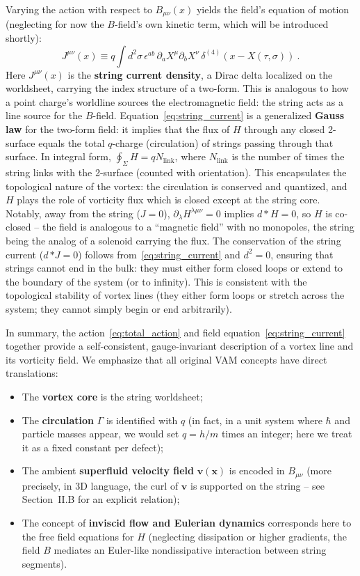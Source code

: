 \documentclass[12pt]{article}
\begin{document}
Varying the action with respect to $B_{\mu\nu}(x)$ yields the field's equation of motion (neglecting for now the $B$-field's own kinetic term, which will be introduced shortly):
\begin{equation}
J^{\mu\nu}(x) \equiv q \int d^2\sigma\, \epsilon^{ab}\, \partial_a X^\mu \partial_b X^\nu\, \delta^{(4)}(x - X(\tau,\sigma))~.
\label{eq:string_current}
\end{equation}
Here $J^{\mu\nu}(x)$ is the \textbf{string current density}, a Dirac delta localized on the worldsheet, carrying the index structure of a two-form. This is analogous to how a point charge's worldline sources the electromagnetic field: the string acts as a line source for the $B$-field. Equation~\eqref{eq:string_current} is a generalized \textbf{Gauss law} for the two-form field: it implies that the flux of $H$ through any closed 2-surface equals the total $q$-charge (circulation) of strings passing through that surface. In integral form, $\oint_{\Sigma} H = q N_{\text{link}}$, where $N_{\text{link}}$ is the number of times the string links with the 2-surface (counted with orientation). This encapsulates the topological nature of the vortex: the circulation is conserved and quantized, and $H$ plays the role of vorticity flux which is closed except at the string core. Notably, away from the string ($J=0$), $\partial_\lambda H^{\lambda\mu\nu}=0$ implies $d*H=0$, so $H$ is co-closed -- the field is analogous to a ``magnetic field'' with no monopoles, the string being the analog of a solenoid carrying the flux. The conservation of the string current ($d\,{*J}=0$) follows from~\eqref{eq:string_current} and $d^2=0$, ensuring that strings cannot end in the bulk: they must either form closed loops or extend to the boundary of the system (or to infinity). This is consistent with the topological stability of vortex lines (they either form loops or stretch across the system; they cannot simply begin or end arbitrarily).

In summary, the action~\eqref{eq:total_action} and field equation~\eqref{eq:string_current} together provide a self-consistent, gauge-invariant description of a vortex line and its vorticity field. We emphasize that all original VAM concepts have direct translations:
\begin{itemize}
    \item The \textbf{vortex core} is the string worldsheet;
    \item The \textbf{circulation} $\Gamma$ is identified with $q$ (in fact, in a unit system where $\hbar$ and particle masses appear, we would set $q = h/m$ times an integer; here we treat it as a fixed constant per defect);
    \item The ambient \textbf{superfluid velocity field} $\mathbf{v}(\mathbf{x})$ is encoded in $B_{\mu\nu}$ (more precisely, in 3D language, the curl of $\mathbf{v}$ is supported on the string -- see Section~II.B for an explicit relation);
    \item The concept of \textbf{inviscid flow and Eulerian dynamics} corresponds here to the free field equations for $H$ (neglecting dissipation or higher gradients, the field $B$ mediates an Euler-like nondissipative interaction between string segments).
\end{itemize}
\end{document}
